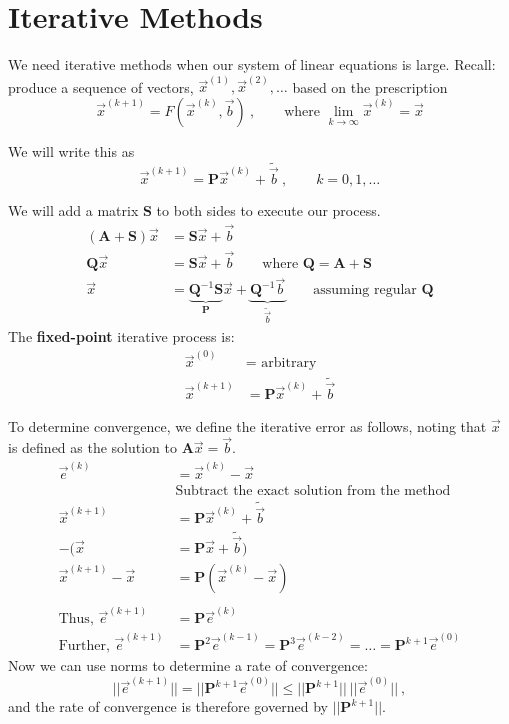 \documentclass[12pt]{article}
\newcommand{\ve}[1]{\ensuremath{\mathbf{#1}}}
\begin{document}
\section*{Iterative Methods}
We need iterative methods when our system of linear equations is large. Recall: produce a sequence of vectors, $\vec{x}^{(1)}, \vec{x}^{(2)}, \dots$ based on the prescription
  \[\vec{x}^{(k+1)} = F(\vec{x}^{(k)}, \vec{b})\:, \qquad \text{where } \displaystyle \lim_{k \rightarrow \infty} \vec{x}^{(k)} = \vec{x}\] 

We will write this as \[\vec{x}^{(k+1)} = \ve{P}\vec{x}^{(k)} +  \tilde{\vec{b}}\:,\qquad k = 0, 1, \dots \]

We will add a matrix $\ve{S}$ to both sides to execute our process.
%
\begin{align}
(\ve{A} + \ve{S}) \vec{x} &= \ve{S}\vec{x} + \vec{b} \nonumber \\
%
\ve{Q} \vec{x} &= \ve{S}\vec{x} + \vec{b} 
\qquad\text{where } \ve{Q} = \ve{A} + \ve{S} \nonumber \\
%
\vec{x} &= \underbrace{\ve{Q}^{-1} \ve{S}}_{\ve{P}}\vec{x} + \underbrace{\ve{Q}^{-1} \vec{b}}_{\tilde{\vec{b}} }
\qquad\text{assuming regular } \ve{Q}\nonumber
\end{align}
%
The \textbf{fixed-point} iterative process is:
\begin{align}
\vec{x}^{(0)} &= \text{ arbitrary}\nonumber \\
\vec{x}^{(k+1)} &= \ve{P}\vec{x}^{(k)} + \tilde{\vec{b}} \nonumber
\end{align}

To determine convergence, we define the iterative error as follows, noting that $\vec{x}$ is defined as the solution to $\ve{A}\vec{x} = \vec{b}$. 
%
\begin{align}
\vec{e}^{(k)} &= \vec{x}^{(k)} - \vec{x} \nonumber \\
%
&\text{Subtract the exact solution from the method} \nonumber \\
%
\vec{x}^{(k+1)} &= \ve{P}\vec{x}^{(k)} + \tilde{\vec{b}} \nonumber \\
- (\vec{x} &= \ve{P}\vec{x} + \tilde{\vec{b}}) \nonumber \\
%
\vec{x}^{(k+1)} - \vec{x} &= \ve{P}(\vec{x}^{(k)} - \vec{x})\nonumber \\
%
\nonumber \\
%
\text{Thus, } \vec{e}^{(k+1)} &= \ve{P}\vec{e}^{(k)} \nonumber \\
%
\text{Further, } \vec{e}^{(k+1)} &= \ve{P}^2\vec{e}^{(k-1)} = \ve{P}^3\vec{e}^{(k-2)} = \dots = \ve{P}^{k+1}\vec{e}^{(0)}\nonumber
%
\end{align}
%
Now we can use norms  to determine a rate of convergence:
\[||\vec{e}^{(k+1)}|| = ||\ve{P}^{k+1}\vec{e}^{(0)}|| \leq ||\ve{P}^{k+1}||\: ||\vec{e}^{(0)}||\:, \]
and the rate of convergence is therefore governed by $||\ve{P}^{k+1}||$.
\end{document}
